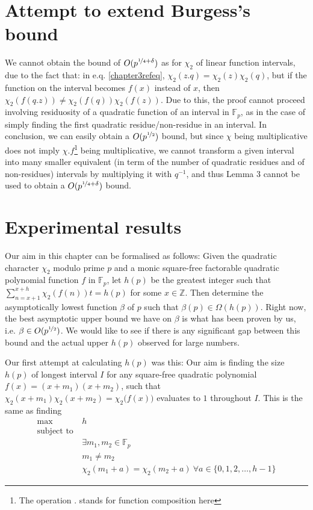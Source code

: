 \documentclass{report}
\begin{document}
\renewcommand{\thefootnote}{\fnsymbol{footnote}}
\section{Attempt to extend Burgess's bound}
We cannot obtain the bound of $O(p^{\nicefrac{1}{4}+\delta})$ as for $\chi_2$ of linear function intervals, due to the fact that: in e.q. \ref{chapter3refeq}, $\chi_2(z.q)=\chi_2(z)\chi_2(q)$, but if the function on the interval becomes $f(x)$ instead of $x$, then $\chi_2(f(q.z))\neq \chi_2(f(q))\chi_2(f(z))$. Due to this, the proof cannot proceed involving residuosity of a quadratic function of an interval in $\mathbb{F}_p$, as in the case of simply finding the first quadratic residue/non-residue in an interval. In conclusion, we can easily obtain a $O(p^{\nicefrac{1}{2}})$ bound, but since $\chi$ being multiplicative does not imply $\chi.f$\footnote[2]{The operation $.$ stands for function composition here} being multiplicative, we cannot transform a given interval into many smaller equivalent (in term of the number of quadratic residues and of non-residues) intervals by multiplying it with $q^{-1}$, and thus Lemma 3 cannot be used to obtain a $O(p^{\nicefrac{1}{4}+\delta})$ bound.

\begin{comment}
~~~ Show that small bucket size will not change distribution density. Initial test for some numbers gave log^2/3 for some number, so we checked log^2/2 to reduce clashes and test a large number of values at it is only a fraction of log^2p thus reasonable constatnt multiple
\end{comment}
%
\section{Experimental results}
%
Our aim in this chapter can be formalised as follows: Given the quadratic character $\chi_2$ modulo prime $p$ and a monic square-free factorable quadratic polynomial function $f$ in $\mathbb{F}_p$, let $h(p)$ be the greatest integer such that $\sum\limits_{n=x+1}^{x+h}\chi_2(f(n))t=h(p)$ for some $x\in\mathbb{Z}$. Then determine the asymptotically lowest function $\beta$ of $p$ such that $\beta(p)\in \Omega(h(p))$. Right now, the best asymptotic upper bound we have on $\beta$ is what has been proven by us, i.e. $\beta \in O(p^{\nicefrac{1}{2}})$. We would like to see if there is any significant gap between this bound and the actual upper $h(p)$ observed for large numbers.

Our first attempt at calculating $h(p)$ was this: Our aim is finding the size $h(p)$ of longest interval $I$ for any square-free quadratic polynomial $f(x)=(x+m_1)(x+m_2)$, such that $\chi_2(x+m_1)\chi_2(x+m_2)=\chi_2 \big(f(x)\big)$ evaluates to $1$ throughout $I$. This is the same as finding
\begin{align*}
  \max\ & h \\
  \text{subject to}\  & \\
  &\exists m_1,m_2 \in \mathbb{F}_p \\
  & m_1 \neq m_2 \\
  &\chi_2(m_1+a)=\chi_2(m_2+a)\ \forall a \in \{0,1,2,\ldots, h-1\}
\end{align*}
\end{document}
